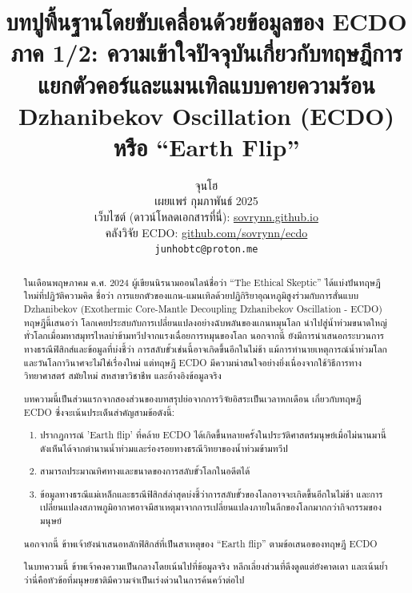 \documentclass[10pt,twocolumn,letterpaper]{article}
\begin{document}
\title{บทปูพื้นฐานโดยขับเคลื่อนด้วยข้อมูลของ ECDO ภาค 1/2: ความเข้าใจปัจจุบันเกี่ยวกับทฤษฎีการแยกตัวคอร์และแมนเทิลแบบคายความร้อน Dzhanibekov Oscillation (ECDO) หรือ “Earth Flip”}

\author{จุนโฮ\\
เผยแพร่ กุมภาพันธ์ 2025\\
เว็บไซต์ (ดาวน์โหลดเอกสารที่นี่): \href{https://sovrynn.github.io}{sovrynn.github.io}\\
คลังวิจัย ECDO: \href{https://github.com/sovrynn/ecdo}{github.com/sovrynn/ecdo}\\
{\tt\small junhobtc@proton.me}
}
\maketitle

\begin{abstract}
ในเดือนพฤษภาคม ค.ศ. 2024 ผู้เขียนนิรนามออนไลน์ชื่อว่า “The Ethical Skeptic” \cite{0} ได้แบ่งปันทฤษฎีใหม่ที่ปฏิวัติความคิด ชื่อว่า การแยกตัวของแกน-แมนเทิลด้วยปฏิกิริยาอุณหภูมิสูงร่วมกับการสั่นแบบ Dzhanibekov (Exothermic Core-Mantle Decoupling Dzhanibekov Oscillation - ECDO) \cite{1} ทฤษฎีนี้เสนอว่า โลกเคยประสบกับการเปลี่ยนแปลงอย่างฉับพลันของแกนหมุนโลก นำไปสู่น้ำท่วมขนาดใหญ่ทั่วโลกเมื่อมหาสมุทรไหลบ่าข้ามทวีปจากแรงเฉื่อยการหมุนของโลก นอกจากนี้ ยังมีการนำเสนอกระบวนการทางธรณีฟิสิกส์และข้อมูลที่บ่งชี้ว่า การสลับขั้วเช่นนี้อาจเกิดขึ้นอีกในไม่ช้า แม้การทำนายเหตุการณ์น้ำท่วมโลกและวันโลกาวินาศจะไม่ใช่เรื่องใหม่ แต่ทฤษฎี ECDO มีความน่าสนใจอย่างยิ่งเนื่องจากใช้วิธีการทางวิทยาศาสตร์ สมัยใหม่ สหสาขาวิชาชีพ และอ้างอิงข้อมูลจริง

บทความนี้เป็นส่วนแรกจากสองส่วนของบทสรุปย่อจากการวิจัยอิสระเป็นเวลาหกเดือน \cite{2,20} เกี่ยวกับทฤษฎี ECDO ซึ่งจะเน้นประเด็นสำคัญสามข้อดังนี้:

\begin{flushleft}
\begin{enumerate}
    \item ปรากฏการณ์ 'Earth flip' ที่คล้าย ECDO ได้เกิดขึ้นหลายครั้งในประวัติศาสตร์มนุษย์เมื่อไม่นานมานี้ ดังเห็นได้จากตำนานน้ำท่วมและร่องรอยทางธรณีวิทยาของน้ำท่วมข้ามทวีป
    \item สามารถประมาณทิศทางและขนาดของการสลับขั้วโลกในอดีตได้
    \item ข้อมูลทางธรณีแม่เหล็กและธรณีฟิสิกส์ล่าสุดบ่งชี้ว่าการสลับขั้วของโลกอาจจะเกิดขึ้นอีกในไม่ช้า และการเปลี่ยนแปลงสภาพภูมิอากาศอาจมีสาเหตุมาจากการเปลี่ยนแปลงภายในลึกของโลกมากกว่ากิจกรรมของมนุษย์
\end{enumerate}
\end{flushleft}

นอกจากนี้ ข้าพเจ้ายังนำเสนอหลักฟิสิกส์ที่เป็นสาเหตุของ “Earth flip” ตามข้อเสนอของทฤษฎี ECDO

ในบทความนี้ ข้าพเจ้าคงความเป็นกลางโดยเน้นไปที่ข้อมูลจริง หลีกเลี่ยงส่วนที่ดึงดูดแต่ยังคาดเดา และเน้นย้ำว่านี่คือหัวข้อที่มนุษยชาติมีความจำเป็นเร่งด่วนในการค้นคว้าต่อไป
\end{abstract}
\end{document}
